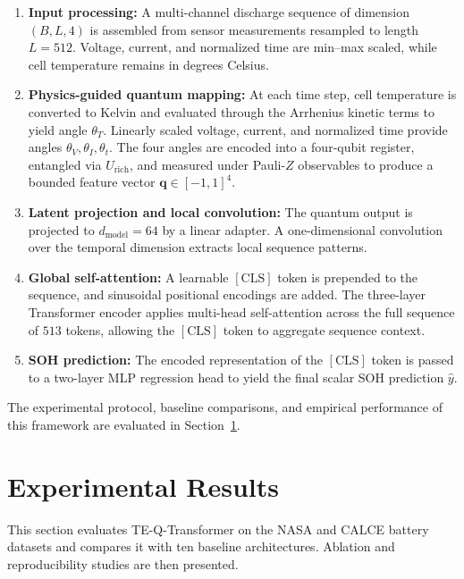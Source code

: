 \documentclass[a4paper,fleqn]{cas-sc}
\begin{document}
\begin{enumerate}[leftmargin=*,noitemsep,topsep=3pt]
\item \textbf{Input processing:} A multi-channel discharge sequence of dimension $(B, L, 4)$ is assembled from sensor measurements resampled to length $L = 512$. Voltage, current, and normalized time are min--max scaled, while cell temperature remains in degrees Celsius.
\item \textbf{Physics-guided quantum mapping:} At each time step, cell temperature is converted to Kelvin and evaluated through the Arrhenius kinetic terms to yield angle $\theta_T$. Linearly scaled voltage, current, and normalized time provide angles $\theta_V, \theta_I, \theta_t$. The four angles are encoded into a four-qubit register, entangled via $U_{\mathrm{rich}}$, and measured under Pauli-$Z$ observables to produce a bounded feature vector $\mathbf{q} \in [-1, 1]^4$.
\item \textbf{Latent projection and local convolution:} The quantum output is projected to $d_{\mathrm{model}} = 64$ by a linear adapter. A one-dimensional convolution over the temporal dimension extracts local sequence patterns.
\item \textbf{Global self-attention:} A learnable $\mathrm{[CLS]}$ token is prepended to the sequence, and sinusoidal positional encodings are added. The three-layer Transformer encoder applies multi-head self-attention across the full sequence of $513$ tokens, allowing the $\mathrm{[CLS]}$ token to aggregate sequence context.
\item \textbf{SOH prediction:} The encoded representation of the $\mathrm{[CLS]}$ token is passed to a two-layer MLP regression head to yield the final scalar SOH prediction $\hat{y}$.
\end{enumerate}

The experimental protocol, baseline comparisons, and empirical performance of this framework are evaluated in Section~\ref{sec:experiments}.







\section{Experimental Results}\label{sec:experiments}

This section evaluates TE-Q-Transformer on the NASA and CALCE battery datasets and compares it with ten baseline architectures. Ablation and reproducibility studies are then presented.
\end{document}
